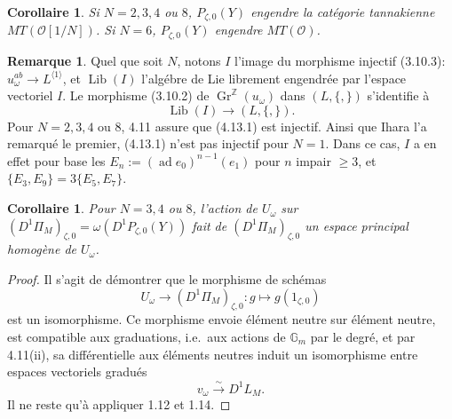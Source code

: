 \documentclass[11pt,a4paper]{article}
\theoremstyle{plain}
\newtheorem{corollary}[theorem]{Corollaire}
\theoremstyle{definition}
\newtheorem{remark}[theorem]{Remarque}
\DeclareMathOperator{\Lib}{Lib}
\DeclareMathOperator{\ad}{ad}
\newcommand{\Gm}{\mathbb{G}_m}
\newcommand{\Z}{\mathbb{Z}}
\newcommand{\Gr}{\operatorname{Gr}}
\begin{document}
\begin{corollary}\label{cor:4.12}
Si $N=2,3,4$ ou $8$, $P_{\zeta,0}(Y)$ engendre la cat\'egorie tannakienne $MT(\mathcal{O}[1/N])$. Si $N=6$, $P_{\zeta,0}(Y)$ engendre $MT(\mathcal{O})$.
\end{corollary}

\begin{remark}\label{rmk:4.13}
Quel que soit $N$, notons $I$ l'image du morphisme injectif (3.10.3): $u_\omega^{ab} \to L^{\langle 1 \rangle}$, et $\Lib(I)$ l'alg\'ebre de Lie librement engendr\'ee par l'espace vectoriel $I$. Le morphisme (3.10.2) de $\Gr^\Z(u_\omega)$ dans $(L, \{,\})$ s'identifie \`a
\begin{equation}\label{eq:4.13.1}
\Lib(I) \to (L, \{,\}).
\end{equation}
Pour $N=2,3,4$ ou $8$, 4.11 assure que (4.13.1) est injectif. Ainsi que Ihara l'a remarqu\'e le premier, (4.13.1) n'est pas injectif pour $N=1$. Dans ce cas, $I$ a en effet pour base les $E_n := (\ad e_0)^{n-1}(e_1)$ pour $n$ impair $\geq 3$, et $\{E_3, E_9\} = 3\{E_5, E_7\}$.
\end{remark}

\begin{corollary}\label{cor:4.14}
Pour $N=3,4$ ou $8$, l'action de $U_\omega$ sur $(D^1\Pi_M)_{\zeta,0} = \omega(D^1P_{\zeta,0}(Y))$ fait de $(D^1\Pi_M)_{\zeta,0}$ un espace principal homog\`ene de $U_\omega$.
\end{corollary}

\begin{proof}
Il s'agit de d\'emontrer que le morphisme de sch\'emas
\begin{equation}\label{eq:4.14.1}
U_\omega \to (D^1\Pi_M)_{\zeta,0}: g \mapsto g(1_{\zeta,0})
\end{equation}
est un isomorphisme. Ce morphisme envoie \'el\'ement neutre sur \'el\'ement neutre, est compatible aux graduations, i.e.~aux actions de $\Gm$ par le degr\'e, et par 4.11(ii), sa diff\'erentielle aux \'el\'ements neutres induit un isomorphisme entre espaces vectoriels gradu\'es
\begin{equation}\label{eq:4.14.2}
v_\omega \xrightarrow{\sim} D^1L_M.
\end{equation}
Il ne reste qu'\`a appliquer 1.12 et 1.14.
\end{proof}
\end{document}
